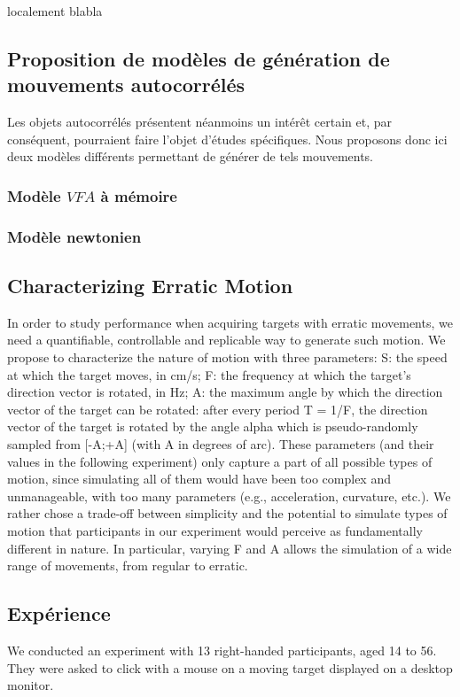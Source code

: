     localement blabla
    
    \subsection{Proposition de modèles de génération de mouvements autocorrélés}
    Les objets autocorrélés présentent néanmoins un intérêt certain et, par conséquent, pourraient faire l'objet d'études spécifiques. Nous proposons donc ici deux modèles différents permettant de générer de tels mouvements.
    
    \subsubsection{Modèle $VFA$ à mémoire}
    
    \subsubsection{Modèle newtonien}

\subsection{Characterizing Erratic Motion}
In order to study performance when acquiring targets with erratic movements, we
need a quantifiable, controllable and replicable way to generate such motion. We
propose to characterize the nature of motion with three parameters:
 S: the speed at which the target moves, in cm/s;
 F: the frequency at which the target's direction vector is rotated, in Hz;
 A: the maximum angle by which the direction vector of the target can be rotated:
after every period T = 1/F, the direction vector of the target is rotated by the angle
alpha which is pseudo-randomly sampled from [-A;+A] (with A in degrees of arc).
These parameters (and their values in the following experiment) only capture a part
of all possible types of motion, since simulating all of them would have been too
complex and unmanageable, with too many parameters (e.g., acceleration, curvature,
etc.). We rather chose a trade-off between simplicity and the potential to simulate
types of motion that participants in our experiment would perceive as fundamentally
different in nature. In particular, varying F and A allows the simulation of a wide
range of movements, from regular to erratic.

\subsection{Expérience}
We conducted an experiment with 13 right-handed participants, aged 14 to 56. They
were asked to click with a mouse on a moving target displayed on a desktop monitor.

